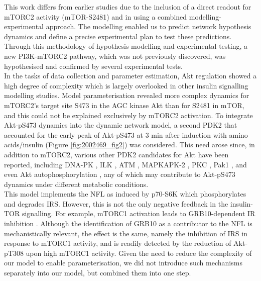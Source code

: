 This work differs from earlier studies \citep{Huang2008, Huang2009signaling, Huang2009complex} due to the inclusion of a direct readout for mTORC2 activity (mTOR-S2481) and in using a combined modelling-experimental approach. The modelling enabled us to predict network hypothesis dynamics and define a precise experimental plan to test these predictions. Through this methodology of hypothesis-modelling and experimental testing, a new PI3K-mTORC2 pathway, which was not previously discovered, was hypothesised and confirmed by several experimental tests.\\
In the tasks of data collection and parameter estimation, Akt regulation showed a high degree of complexity which is largely overlooked in other insulin signalling modelling studies. Model parameterisation revealed more complex dynamics for mTORC2's target site S473 in the AGC kinase Akt than for S2481 in mTOR, and this could not be explained exclusively by mTORC2 activation. To integrate Akt-pS473 dynamics into the dynamic network model, a second PDK2 that accounted for the early peak of Akt-pS473 at 3 min after induction with amino acids/insulin (Figure \ref{fig:2002469_fig2}) was considered. This need arose since, in addition to mTORC2, various other PDK2 candidates for Akt have been reported, including DNA-PK \citep{Bozulic2008, Feng2004}, ILK \citep{Troussard2003}, ATM \citep{Viniegra2004}, MAPKAPK-2 \citep{Rane2000}, PKC \citep{Kawakami2004, Partovian2004}, Pak1 \citep{Mao2008}, and even Akt autophosphorylation \citep{Toker2000}, any of which may contribute to Akt-pS473 dynamics under different 
metabolic conditions. \\
This model implements the NFL as induced by p70-S6K which phosphorylates and degrades IRS. However, this is not the only negative feedback in the insulin-TOR signalling. For example, mTORC1 activation leads to GRB10-dependent IR inhibition \citep{Yu2011, Hsu2011}. Although the identification of GRB10 as a contributor to the NFL is mechanistically relevant, the effect is the same, namely the inhibition of IRS in response to mTORC1 activity, and is readily detected by the reduction of Akt-pT308 upon high mTORC1 activity. Given the need to reduce the complexity of our model to enable parameterisation, we did not introduce such mechanisms separately into our model, but combined them into one step. \\
